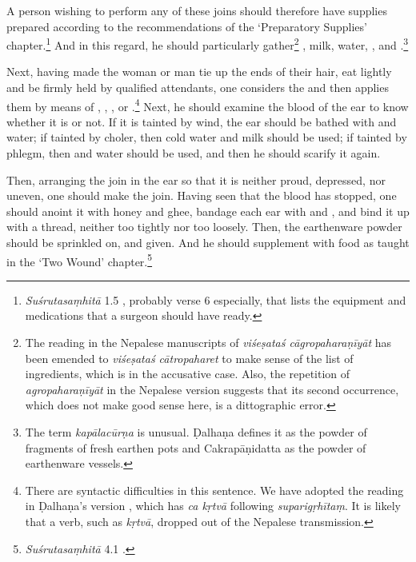 \begin{translation}
    A person wishing to perform any of these joins should therefore have supplies prepared according to the recommendations of the `Preparatory
    Supplies' chapter.\footnote{\emph{Suśrutasaṃhitā} 1.5 
    \citep[18–23]{vulgate}, probably verse 6 especially, that lists the equipment 
    and medications that a surgeon should have ready.}  And in this regard, he 
    should particularly gather\footnote{The reading in the Nepalese manuscripts of 
    \emph{viśeṣataś cāgropaharaṇīyāt} has been emended to \emph{viśeṣataś 
    cātropaharet} to make sense of the list of ingredients, which is in the 
    accusative case. Also, the repetition of \emph{agropaharaṇīyāt} in the 
    Nepalese version suggests that its second occurrence, which does not make 
    good sense here, is a dittographic error.} , 
    milk, water,
    , and .\footnote{The term \emph{kapālacūrṇa} is unusual. Ḍalhaṇa \citep[79]{vulgate} defines it as the powder of fragments of fresh earthen pots and Cakrapāṇidatta \citep[129]{acar-1939} as the powder of earthenware vessels.}  
    
    Next, having made the woman or man tie up the
ends of their hair, eat lightly and be firmly held by
qualified attendants, one considers the  and then applies
them by means of , ,
, or .\footnote{There are 
syntactic difficulties 
in this sentence.  We have 
adopted the reading in 
Ḍalhaṇa's version \citep[78]{vulgate}, which has
\emph{ca kṛtvā} following \emph{suparigṛhītaṃ}. It is likely that a verb, such
as \emph{kṛtvā}, dropped out of the Nepalese transmission.}  Next, he should
examine the blood of the ear to know whether it is  or not.
If it is tainted by wind, the ear should be bathed with
 and water; if tainted by choler, then
cold water and milk should be used; if tainted by phlegm, then
 and water should be used, and then he should
scarify it again.
    
    
    Then, arranging the join in the ear so that it is neither proud, depressed, nor
    uneven, one should make the join. Having seen that the blood has stopped, one should anoint it with honey and ghee,
    bandage each ear with  and , and
    bind it up with a thread, neither too tightly nor too loosely.  Then, the earthenware
    powder should be sprinkled on, and  given.
    And he should supplement with food as taught in  the `Two Wound'
    chapter.\footnote{\emph{Suśrutasaṃhitā} 4.1 \citep[396–408]{vulgate}.}
    

\end{translation}
